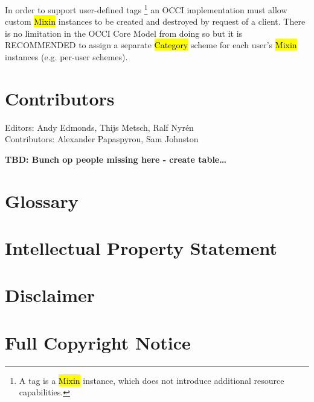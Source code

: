 \documentclass[10pt,a4paper]{article}
\begin{document}
In order to support user-defined tags%
\footnote{A tag is a \hl{Mixin} instance, which does not introduce additional
resource capabilities.}
an OCCI implementation must allow custom
\hl{Mixin} instances to be created and destroyed by request of a client.
There is no limitation in the OCCI Core Model from doing so but it is RECOMMENDED to
assign a separate \hl{Category} scheme for each user's \hl{Mixin} instances (e.g. per-user schemes).

\section{Contributors}
Editors: Andy Edmonds, Thijs Metsch, Ralf Nyrén \\
Contributors: Alexander Papaspyrou, Sam Johnston

\textbf{TBD: Bunch op people missing here - create table\ldots}

\section{Glossary}
\label{sec:glossary}



\section{Intellectual Property Statement}


\section{Disclaimer}


\section{Full Copyright Notice}




\end{document}
